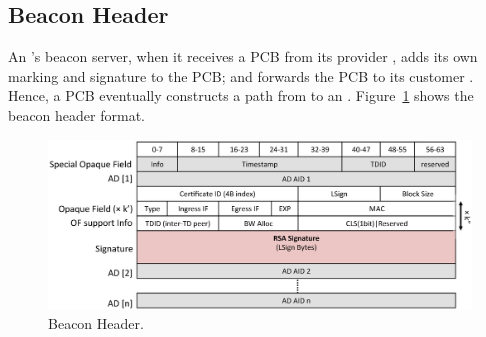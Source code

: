 \subsection{Beacon Header}
An \AD's beacon server, when it receives a PCB from its provider \AD, adds its own marking and signature to the PCB; and forwards the PCB to its customer \AD. Hence, a PCB eventually constructs a path from \TDC to an \STUB \AD. Figure~\ref{fig:hdr-beacon} shows the beacon header format.

\begin{figure}[ht]
\centering
\includegraphics[width=.9\columnwidth]{./fig/nhdr_pcb.eps}
\caption{Beacon Header.}\label{fig:hdr-beacon}
\end{figure}

